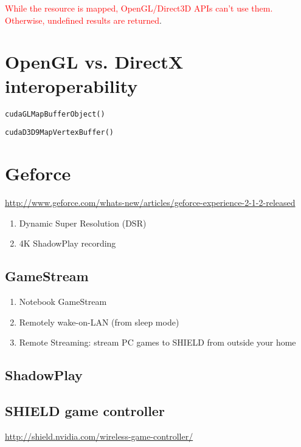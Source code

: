 \textcolor{red}{While the resource is mapped, OpenGL/Direct3D APIs can't use
them. Otherwise, undefined results are returned}. 


\section{OpenGL vs. DirectX interoperability}
\label{sec:opengl-vs.-directx}

\verb!cudaGLMapBufferObject()!

\verb!cudaD3D9MapVertexBuffer()!



\section{Geforce}

  \url{http://www.geforce.com/whats-new/articles/geforce-experience-2-1-2-released}
\begin{enumerate}
  \item Dynamic Super Resolution (DSR)
  \item 4K ShadowPlay recording

\end{enumerate}
\subsection{GameStream}

\begin{enumerate}
  \item Notebook GameStream
  \item Remotely wake-on-LAN (from sleep mode)
  \item Remote Streaming: stream PC games to SHIELD from outside your home
\end{enumerate}



\subsection{ShadowPlay}

\subsection{SHIELD game controller}

\url{http://shield.nvidia.com/wireless-game-controller/}